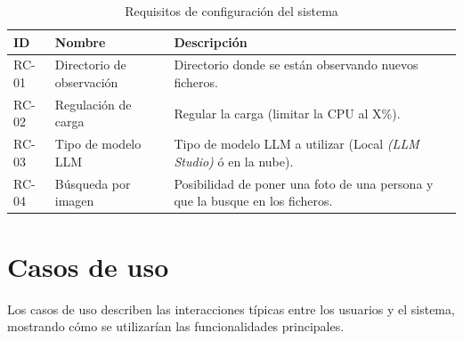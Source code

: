 \begin{table}[H]
\centering
\begin{tabular}{|p{1cm}|p{4cm}|p{9cm}|}
\hline
\textbf{ID} & \textbf{Nombre} & \textbf{Descripción} \\
\hline
RC-01 & Directorio de observación & Directorio donde se están observando nuevos ficheros. \\
\hline
RC-02 & Regulación de carga & Regular la carga (limitar la CPU al X\%). \\
\hline
RC-03 & Tipo de modelo LLM & Tipo de modelo LLM a utilizar (Local \textit{(LLM Studio)} ó en la nube). \\
\hline
RC-04 & Búsqueda por imagen & Posibilidad de poner una foto de una persona y que la busque en los ficheros. \\
\hline
\end{tabular}
\caption{Requisitos de configuración del sistema}
\label{tab:req_configuracion}
\end{table}

\section{Casos de uso}
Los casos de uso describen las interacciones típicas entre los usuarios y el sistema, mostrando cómo se utilizarían las funcionalidades principales.
